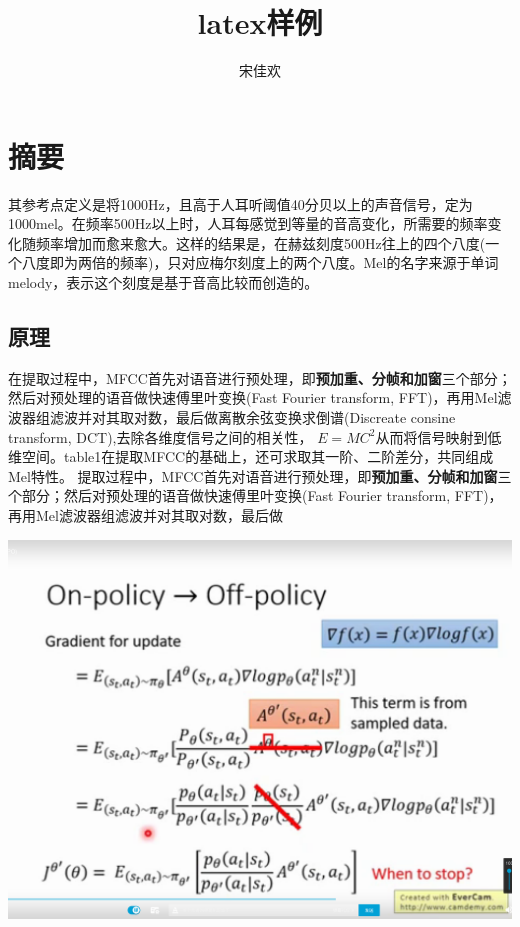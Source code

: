 \documentclass[UTF8]{ctexart} %
\title{latex样例}
\author{宋佳欢}
\begin{document}
 
	\maketitle %
	\tableofcontents %
	\songti {}  %
	\section{摘要}
	其参考点定义是将1000Hz，且高于人耳听阈值40分贝以上的声音信号，定为1000mel。在频率500Hz以上时，人耳每感觉到等量的音高变化，所需要的频率变化随频率增加而愈来愈大。这样的结果是，在赫兹刻度500Hz往上的四个八度(一个八度即为两倍的频率)，只对应梅尔刻度上的两个八度。Mel的名字来源于单词melody，表示这个刻度是基于音高比较而创造的。 
		 \subsection{原理}
			\begin{multicols}{2} %
			在提取过程中，MFCC首先对语音进行预处理，即\textbf{预加重、分帧和加窗}三个部分；然后对预处理的语音做快速傅里叶变换(Fast Fourier transform, FFT)，再用Mel滤波器组滤波并对其取对数，最后做离散余弦变换求倒谱(Discreate consine transform, DCT),去除各维度信号之间的相关性，	
			$E=MC^2$从而将信号映射到低维空间。table1在提取MFCC的基础上，还可求取其一阶、二阶差分，共同组成Mel特性。
			提取过程中，MFCC首先对语音进行预处理，即\textbf{预加重、分帧和加窗}三个部分；然后对预处理的语音做快速傅里叶变换(Fast Fourier transform, FFT)，再用Mel滤波器组滤波并对其取对数，最后做
			 
			\centering\includegraphics[scale=0.15]{pg.png}

			\end{multicols}
			
\end{document}
